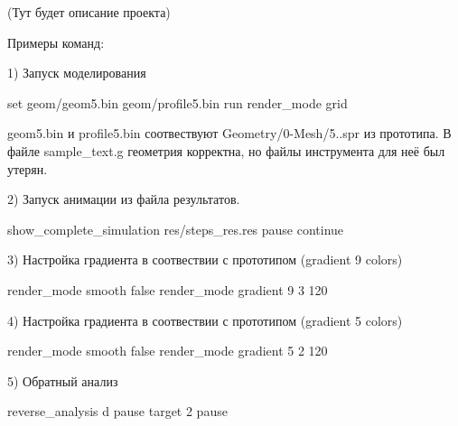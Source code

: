 (Тут будет описание проекта)

Примеры команд\+:

1) Запуск моделирования

set geom/geom5.\+bin geom/profile5.\+bin run render\+\_\+mode grid

geom5.\+bin и profile5.\+bin соотвествуют Geometry/0-\/\+Mesh/5..\+spr из прототипа. В файле sample\+\_\+text.\+g геометрия корректна, но файлы инструмента для неё был утерян.

2) Запуск анимации из файла результатов.

show\+\_\+complete\+\_\+simulation res/steps\+\_\+res.\+res pause continue

3) Настройка градиента в соотвествии с прототипом (gradient 9 colors)

render\+\_\+mode smooth false render\+\_\+mode gradient 9 3 120

4) Настройка градиента в соотвествии с прототипом (gradient 5 colors)

render\+\_\+mode smooth false render\+\_\+mode gradient 5 2 120

5) Обратный анализ

reverse\+\_\+analysis d pause target 2 pause 